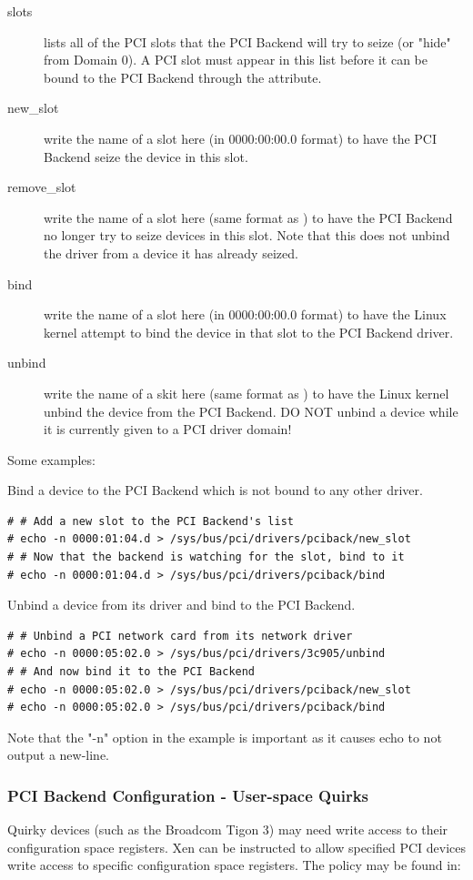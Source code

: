 \documentclass[11pt,twoside,final,openright]{report}
\begin{document}
\begin{description}
\item[slots] lists all of the PCI slots that the PCI Backend will try to seize
  (or "hide" from Domain 0). A PCI slot must appear in this list before it can
  be bound to the PCI Backend through the  attribute.
\item[new\_slot] write the name of a slot here (in 0000:00:00.0 format) to
  have the PCI Backend seize the device in this slot.
\item[remove\_slot] write the name of a slot here (same format as
  ) to have the PCI Backend no longer try to seize devices in
  this slot. Note that this does not unbind the driver from a device it has
  already seized.
\item[bind] write the name of a slot here (in 0000:00:00.0 format) to have
  the Linux kernel attempt to bind the device in that slot to the PCI Backend
  driver.
\item[unbind] write the name of a skit here (same format as ) to have
  the Linux kernel unbind the device from the PCI Backend. DO NOT unbind a
  device while it is currently given to a PCI driver domain!
\end{description}

Some examples:

Bind a device to the PCI Backend which is not bound to any other driver.
\begin{verbatim}
# # Add a new slot to the PCI Backend's list
# echo -n 0000:01:04.d > /sys/bus/pci/drivers/pciback/new_slot
# # Now that the backend is watching for the slot, bind to it
# echo -n 0000:01:04.d > /sys/bus/pci/drivers/pciback/bind
\end{verbatim}

Unbind a device from its driver and bind to the PCI Backend.
\begin{verbatim}
# # Unbind a PCI network card from its network driver
# echo -n 0000:05:02.0 > /sys/bus/pci/drivers/3c905/unbind
# # And now bind it to the PCI Backend
# echo -n 0000:05:02.0 > /sys/bus/pci/drivers/pciback/new_slot
# echo -n 0000:05:02.0 > /sys/bus/pci/drivers/pciback/bind
\end{verbatim}

Note that the "-n" option in the example is important as it causes echo to not
output a new-line.

\subsubsection{PCI Backend Configuration - User-space Quirks}
Quirky devices (such as the Broadcom Tigon 3) may need write access to their
configuration space registers.  Xen can be instructed to allow specified PCI
devices write access to specific configuration space registers.  The policy may
be found in:
\end{document}
